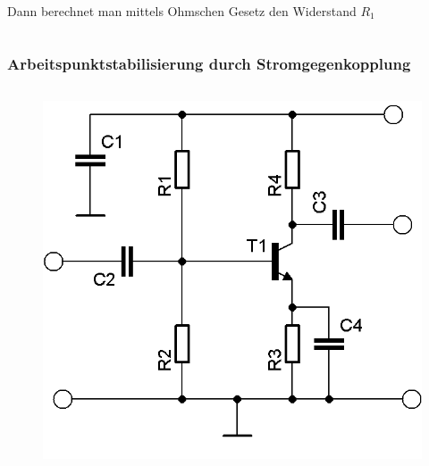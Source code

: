 \begin{frame}
\begin{columns}
\begin{itemize}
{      \item Dann berechnet man mittels Ohmschen Gesetz den Widerstand $R_1$
        }
    \end{itemize}
  \end{columns}
\end{frame}

\begin{frame}
  \frametitle{Arbeitspunktstabilisierung durch Stromgegenkopplung}
  \begin{columns}
    \begin{center}
      \begin{figure}
        \includegraphics[width=\textwidth,height=.85\textheight,keepaspectratio]{a06/Transistor-Verstaerker-APstab1.png}
      \end{figure}
    \end{center}

\end{columns}
\end{frame}
